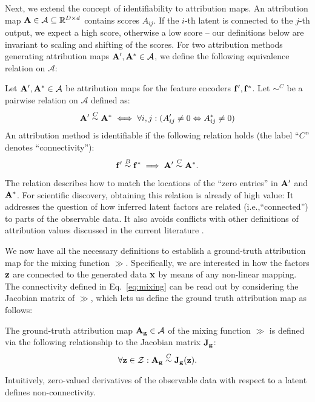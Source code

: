     Next, we extend the concept of identifiability to attribution maps.
    An attribution map $\AA \in \mathcal{A} \subseteq \R^{D \times d}$ contains scores $A_{ij}$. If the $i$-th latent is connected to the $j$-th output, we expect a high score, otherwise a low score -- our definitions below are invariant to scaling and shifting of the scores. 
    For two attribution methods generating attribution maps $\AA', \AA^* \in \mathcal{A}$, we define the following equivalence relation on $\mathcal{A}$:
    \begin{definition} \label{def:ident-attr}
        Let $\AA',\AA^* \in \mathcal A$ be attribution maps for the feature encoders $\ff',\ff^*$. Let $\mathrel{\mathop{\sim}^C}$ be a pairwise relation on $\mathcal{A}$ defined as:
        \begin{equation}
        \AA' \mathrel{\mathop{\sim}^C} \AA^* \iff
        \forall i,j:
            (A_{ij}' \neq 0 \Leftrightarrow A^*_{ij} \neq 0)
        \end{equation}
        An attribution method is identifiable if the following relation holds (the label ``$C$'' denotes ``connectivity''):
        \begin{equation}
            \ff' \mathrel{\mathop{\sim}^B} \ff^* \implies \AA' \mathrel{\mathop{\sim}^C} \AA^*.
        \end{equation}
    \end{definition}
    The relation describes how to match the locations of the ``zero entries'' in $\AA'$ and $\AA^*$. For scientific discovery, obtaining this relation is already of high value: It addresses the question of how inferred latent factors are related (i.e.,``connected'') to parts of the observable data. It also avoids conflicts with other definitions of attribution values discussed in the current literature \citep{Sundararajan2017AxiomaticAF,afchar2021nonzero}. 

    We now have all the necessary definitions to establish a ground-truth attribution map for the mixing function $\gg$. Specifically, we are interested in how the factors $\zz$ are connected to the generated data $\xx$ by means of any non-linear mapping. The connectivity defined in Eq.~\ref{eq:mixing} can be read out by considering the Jacobian matrix of $\gg$, which lets us define the ground truth attribution map as follows:
    \begin{definition} \label{def:gt-attribution}
        The ground-truth attribution map $\AA_\gg \in \mathcal{A}$ of the mixing function $\gg$ is defined via the following relationship to the Jacobian matrix $\JJ_\gg$:
        \begin{equation}
        \forall \zz \in \mathcal{Z}: 
            \AA_\gg \mathrel{\mathop{\sim}^C}
            \JJ_\mathbf{\gg}(\zz). 
        \end{equation}
    \end{definition}
    Intuitively, zero-valued derivatives of the observable data with respect to a latent defines non-connectivity.

